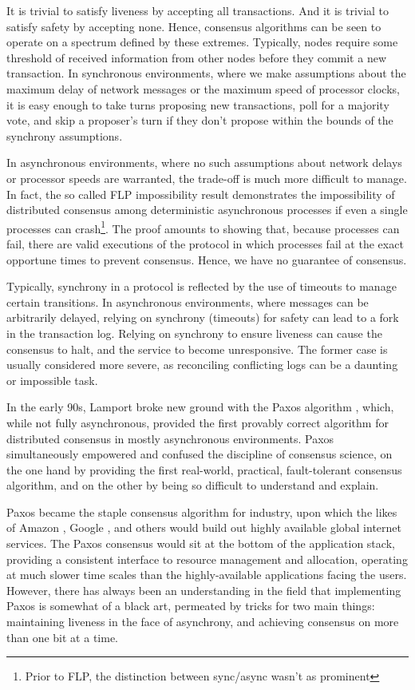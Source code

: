 It is trivial to satisfy liveness by accepting all transactions. And it is trivial to satisfy safety by accepting none.
Hence, consensus algorithms can be seen to operate on a spectrum defined by these extremes.
Typically, nodes require some threshold of received information from other nodes before they commit a new transaction.
In synchronous environments, 
where we make assumptions about the maximum delay of network messages or the maximum speed of processor clocks,
 it is easy enough to take turns proposing new transactions, poll for a majority vote, 
and skip a proposer's turn if they don't propose within the bounds of the synchrony assumptions.

In asynchronous environments, where no such assumptions about network delays or processor speeds are warranted,
the trade-off is much more difficult to manage.
In fact, the so called FLP impossibility result demonstrates the 
impossibility of distributed consensus among deterministic asynchronous processes 
if even a single processes can crash\footnote{Prior to FLP, the distinction between sync/async wasn't as prominent}\cite{flp}.
The proof amounts to showing that, because processes can fail, 
there are valid executions of the protocol in which processes fail at the exact opportune times to prevent consensus.
Hence, we have no guarantee of consensus.

Typically, synchrony in a protocol is reflected by the use of timeouts to manage certain transitions.
In asynchronous environments, where messages can be arbitrarily delayed, relying on synchrony (timeouts) for safety
can lead to a fork in the transaction log.
Relying on synchrony to ensure liveness can cause the consensus to halt, and the service to become unresponsive.
The former case is usually considered more severe, as reconciling conflicting logs can be a daunting or impossible task. 

In the early 90s, Lamport broke new ground with the Paxos algorithm \cite{paxos},
which, while not fully asynchronous,
provided the first provably correct algorithm for distributed consensus in mostly asynchronous environments.
Paxos simultaneously empowered and confused the discipline of consensus science,
on the one hand by providing the first real-world, practical, fault-tolerant consensus algorithm,
and on the other by being so difficult to understand and explain.

Paxos became the staple consensus algorithm for industry, 
upon which the likes of Amazon \cite{dynamo}, Google \cite{chubby}, 
and others would build out highly available global internet services.
The Paxos consensus would sit at the bottom of the application stack, 
providing a consistent interface to resource management and allocation, 
operating at much slower time scales than the highly-available applications facing the users.
However, there has always been an understanding in the field that implementing Paxos is somewhat of a black art,
permeated by tricks for two main things: 
maintaining liveness in the face of asynchrony, and achieving consensus on more than one bit at a time.

